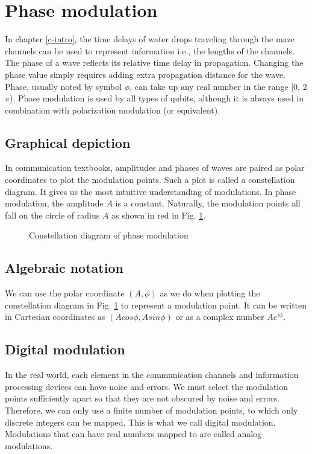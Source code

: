 \documentclass[oneside, letter, 12pt]{book}
\begin{document}
\section{Phase modulation}
In chapter \ref{c-intro}, the time delays of water drops traveling through the maze channels can be used to represent information i.e., the lengths of the channels. The phase of a wave reflects its relative time delay in propagation. Changing the phase value simply requires adding extra propagation distance for the wave. Phase, usually noted by symbol $\phi$, can take up any real number in the range [0, 2$\pi$). Phase modulation is used by all types of qubits, although it is always used in combination with polarization modulation (or equivalent).

\subsection{Graphical depiction}
In communication textbooks, amplitudes and phases of waves are paired as polar coordinates to plot the modulation points. Such a plot is called a constellation diagram. It gives us the most intuitive understanding of modulations. In phase modulation, the amplitude $A$ is a constant. Naturally, the modulation points all fall on the circle of radius $A$ as shown in red in Fig. \ref{PM}.

\begin{figure}[h]\label{PM}
\caption{Constellation diagram of phase modulation}
\end{figure}

\subsection{Algebraic notation}
We can use the polar coordinate $(A, \phi)$ as we do when plotting the constellation diagram in Fig. \ref{PM} to represent a modulation point. It can be written in Cartesian coordinates as $(A cos\phi, A sin\phi)$ or as a complex number $A e^{i\phi}$.

\subsection{Digital modulation}
In the real world, each element in the communication channels and information processing devices can have noise and errors. We must select the modulation points sufficiently apart so that they are not obscured by noise and errors. Therefore, we can only use a finite number of modulation points, to which only discrete integers can be mapped. This is what we call digital modulation. Modulations that can have real numbers mapped to are called analog modulations.
\end{document}
